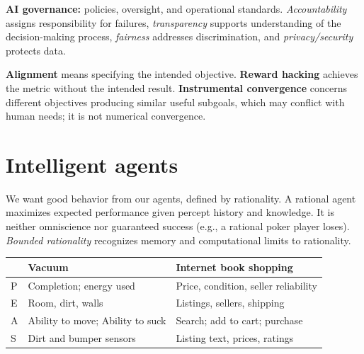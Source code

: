 \documentclass{report}
\begin{document}
\textbf{AI governance:} policies, oversight, and operational standards. \emph{Accountability} assigns responsibility for failures, \emph{transparency} supports understanding of the decision-making process, \emph{fairness} addresses discrimination, and \emph{privacy/security} protects data.

\textbf{Alignment} means specifying the intended objective. \textbf{Reward hacking} achieves the metric without the intended result. \textbf{Instrumental convergence} concerns different objectives producing similar useful subgoals, which may conflict with human needs; it is not numerical convergence.

\section{Intelligent agents}



We want good behavior from our agents, defined by rationality. A rational agent maximizes expected performance given percept history and knowledge. It is neither omniscience nor guaranteed success (e.g., a rational poker player loses). \emph{Bounded rationality} recognizes memory and computational limits to rationality.

\begin{center}
\begin{tabularx}{\textwidth}{@{}l>{\raggedright\arraybackslash}X>{\raggedright\arraybackslash}X@{}}
\toprule
 & Vacuum & Internet book shopping\\\midrule
P & Completion; energy used & Price, condition, seller reliability\\
E & Room, dirt, walls & Listings, sellers, shipping\\
A & Ability to move; Ability to suck & Search; add to cart; purchase\\
S & Dirt and bumper sensors & Listing text, prices, ratings\\\bottomrule
\end{tabularx}
\end{center}
\end{document}
